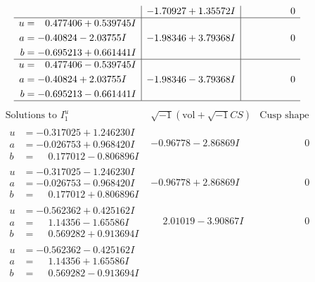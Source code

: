 \documentclass[1p]{elsarticle_modified}
\theoremstyle{definition}
\newcommand{\I}{\sqrt{-1}}
\begin{document}
$$\begin{array}{c|c|c}
 & -1.70927 + 1.35572 I & \phantom{-0.000000 } 0 \\ \hline\begin{aligned}
u &= \phantom{-}0.477406 + 0.539745 I \\
a &= -0.40824 - 2.03755 I \\
b &= -0.695213 + 0.661441 I\end{aligned}
 & -1.98346 + 3.79368 I & \phantom{-0.000000 } 0 \\ \hline\begin{aligned}
u &= \phantom{-}0.477406 - 0.539745 I \\
a &= -0.40824 + 2.03755 I \\
b &= -0.695213 - 0.661441 I\end{aligned}
 & -1.98346 - 3.79368 I & \phantom{-0.000000 } 0\\
 \hline 
 \end{array}$$\newpage$$\begin{array}{c|c|c}  
\text{Solutions to }I^u_{1}& \I (\text{vol} + \sqrt{-1}CS) & \text{Cusp shape}\\
 \hline 
\begin{aligned}
u &= -0.317025 + 1.246230 I \\
a &= -0.026753 + 0.968420 I \\
b &= \phantom{-}0.177012 - 0.806896 I\end{aligned}
 & -0.96778 - 2.86869 I & \phantom{-0.000000 } 0 \\ \hline\begin{aligned}
u &= -0.317025 - 1.246230 I \\
a &= -0.026753 - 0.968420 I \\
b &= \phantom{-}0.177012 + 0.806896 I\end{aligned}
 & -0.96778 + 2.86869 I & \phantom{-0.000000 } 0 \\ \hline\begin{aligned}
u &= -0.562362 + 0.425162 I \\
a &= \phantom{-}1.14356 - 1.65586 I \\
b &= \phantom{-}0.569282 + 0.913694 I\end{aligned}
 & \phantom{-}2.01019 - 3.90867 I & \phantom{-0.000000 } 0 \\ \hline\begin{aligned}
u &= -0.562362 - 0.425162 I \\
a &= \phantom{-}1.14356 + 1.65586 I \\
b &= \phantom{-}0.569282 - 0.913694 I\end{aligned}

\end{array}$$
\end{document}
